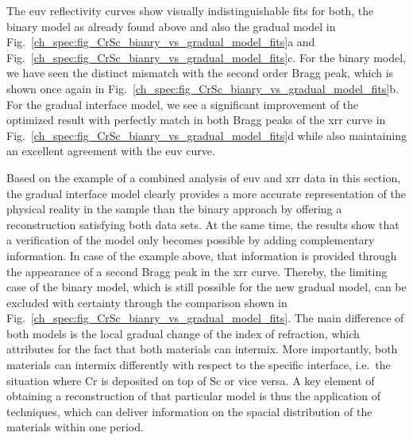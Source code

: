 The \gls{euv} reflectivity curves show visually indistinguishable fits for both, the binary model as already found above and also the gradual model in Fig.~\ref{ch_spec:fig_CrSc_bianry_vs_gradual_model_fits}a and Fig.~\ref{ch_spec:fig_CrSc_bianry_vs_gradual_model_fits}c. For the binary model, we have seen the distinct mismatch with the second order Bragg peak, which is shown once again in Fig.~\ref{ch_spec:fig_CrSc_bianry_vs_gradual_model_fits}b. For the gradual interface model, we see a significant improvement of the optimized result with perfectly match in both Bragg peaks of the \gls{xrr} curve in Fig.~\ref{ch_spec:fig_CrSc_bianry_vs_gradual_model_fits}d while also maintaining an excellent agreement with the \gls{euv} curve.

Based on the example of a combined analysis of \gls{euv} and \gls{xrr} data in this section, the gradual interface model clearly provides a more accurate representation of the physical reality in the sample than the binary approach by offering a reconstruction satisfying both data sets. At the same time, the results show that a verification of the model only becomes possible by adding complementary information. In case of the example above, that information is provided through the appearance of a second Bragg peak in the \gls{xrr} curve. Thereby, the limiting case of the binary model, which is still possible for the new gradual model, can be excluded with certainty through the comparison shown in Fig.~\ref{ch_spec:fig_CrSc_bianry_vs_gradual_model_fits}. The main difference of both models is the local gradual change of the index of refraction, which attributes for the fact that both materials can intermix. More importantly, both materials can intermix differently with respect to the specific interface, i.e.~the situation where Cr is deposited on top of Sc or vice versa. A key element of obtaining a reconstruction of that particular model is thus the application of techniques, which can deliver information on the spacial distribution of the materials within one period.

